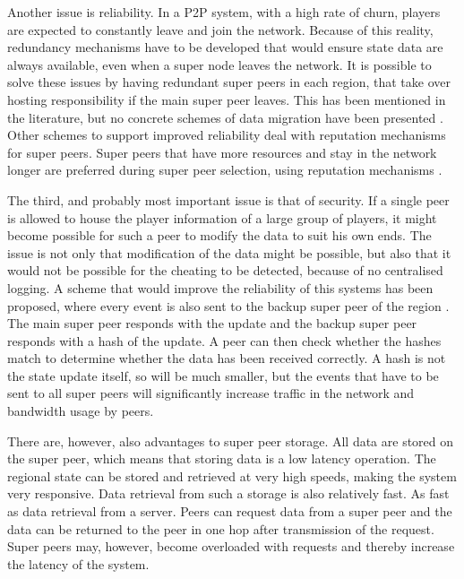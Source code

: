 \documentclass[journal,oneside,a4paper,onecolumn]{IEEEtran}
\begin{document}
Another issue is reliability. In a P2P system, with a high rate of churn, players are expected to constantly leave and join the network. Because of this reality, redundancy mechanisms have to be developed that would ensure state data are always available, even when a super node leaves the network. It is possible to solve these issues by having redundant super peers in each region, that take over hosting responsibility if the main super peer leaves. This has been mentioned in the literature, but no concrete schemes of data migration have been presented \cite{}. Other schemes to support improved reliability deal with reputation mechanisms for super peers. Super peers that have more resources and stay in the network longer are preferred during super peer selection, using reputation mechanisms \cite{fan_mediator_paper}.

The third, and probably most important issue is that of security. If a single peer is allowed to house the player information of a large group of players, it might become possible for such a peer to modify the data to suit his own ends. The issue is not only that modification of the data might be possible, but also that it would not be possible for the cheating to be detected, because of no centralised logging. A scheme that would improve the reliability of this systems has been proposed, where every event is also sent to the backup super peer of the region \cite{past_storage_focus}. The main super peer responds with the update and the backup super peer responds with a hash of the update. A peer can then check whether the hashes match to determine whether the data has been received correctly. A hash is not the state update itself, so will be much smaller, but the events that have to be sent to all super peers will significantly increase traffic in the network and bandwidth usage by peers.

There are, however, also advantages to super peer storage. All data are stored on the super peer, which means that storing data is a low latency operation. The regional state can be stored and retrieved at very high speeds, making the system very responsive. Data retrieval from such a storage is also relatively fast. As fast as data retrieval from a server. Peers can request data from a super peer and the data can be returned to the peer in one hop after transmission of the request. Super peers may, however, become overloaded with requests and thereby increase the latency of the system.
\end{document}
